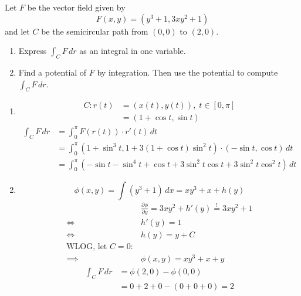 \begin{exercise}
	Let $F$ be the vector field given by
	$$
		F(x,y) = (y^3 + 1, 3xy^2 + 1)
	$$
	and let $C$ be the semicircular path from $(0,0)$ to $(2,0)$.
	\begin{enumerate}
		\item Express $\int_C F \, dr$ as an integral in one variable.

		\item Find a potential of $F$ by integration. Then use the potential to compute $\int_C F \, dr$.
	\end{enumerate}
\end{exercise}

\begin{solution}
	\begin{enumerate}
		\item
		      $$
			      \begin{aligned}
				      C: r(t) & = (x(t),y(t)), \; t \in [0, \pi] \\
				              & = (1 + \cos t, \sin t)
			      \end{aligned}
		      $$
		      $$
			      \begin{aligned}
				      \int_C F \, dr & = \int_{0}^{\pi} F(r(t)) \cdot r'(t) \, dt                                                      \\
				                     & = \int_{0}^{\pi} (1 + \sin^3 t, 1 + 3 (1 + \cos t) \sin^2 t) \cdot (-\sin t, \cos t) \, dt      \\
				                     & = \int_{0}^{\pi} ( -\sin t - \sin^4 t + \cos t + 3 \sin^2 t \cos t + 3 \sin^2 t \cos^2 t) \, dt
			      \end{aligned}
		      $$

		\item
		      $$
			      \phi(x,y) = \int (y^3 + 1) \, dx = xy^3 + x + h(y)
		      $$
		      $$
			      \begin{aligned}
				               & \frac{\partial \phi}{\partial y} = 3xy^2 + h'(y) \overset{!}{=} 3xy^2 + 1 \\
				      \iff     & h'(y) = 1                                                                 \\
				      \iff     & h(y) = y + C \quad                                                        \\
				      \text{WLOG, let } C = 0:                                                             \\
				      \implies & \phi(x,y) = xy^3 + x + y
			      \end{aligned}
		      $$
		      $$
			      \begin{aligned}
				      \int_C F \, dr & = \phi(2, 0) - \phi(0, 0) \\
				                     & = 0+2+0 - (0+0+0) = 2     \\
			      \end{aligned}
		      $$
	\end{enumerate}
\end{solution}
